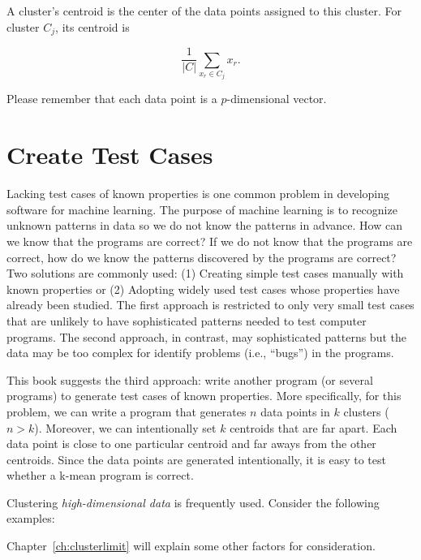 A cluster's centroid is  the center of the data points assigned to this cluster.
For cluster $C_j$, its centroid is 

\begin{equation}
\frac{1}{|C|} \underset{x_r \in C_j}{\sum} x_r.
\end{equation}  

Please remember that each data point is a $p$-dimensional vector.

\section{Create Test Cases}

Lacking test cases of known properties is one common problem in
developing software for machine learning.  The purpose of machine
learning is to recognize unknown patterns in data so we do not know
the patterns in advance.  How can we know that the programs are
correct?  If we do not know that the programs are correct, how do we
know the patterns discovered by the programs are correct?  Two
solutions are commonly used: (1) Creating simple test cases manually
with known properties or (2) Adopting widely used test cases whose
properties have already been studied. The first approach is restricted
to only very small test cases that are unlikely to have sophisticated
patterns needed to test computer programs.  The second approach, in
contrast, may sophisticated patterns but the data may be too complex
for identify problems (i.e., ``bugs'') in the programs.

This book suggests the third approach: write another program (or
several programs) to generate test cases of known properties.  More
specifically, for this problem, we can write a program that generates
$n$ data points in $k$ clusters ($n > k$). Moreover, we can
intentionally set $k$ centroids that are far apart. Each data point is
close to one particular centroid and far aways from the other
centroids.  Since the data points are generated intentionally, it is
easy to test whether a k-mean program is correct.

Clustering {\it high-dimensional data} is frequently used. Consider
the following examples:



Chapter~\ref{ch:clusterlimit}
will explain some other factors for consideration.
